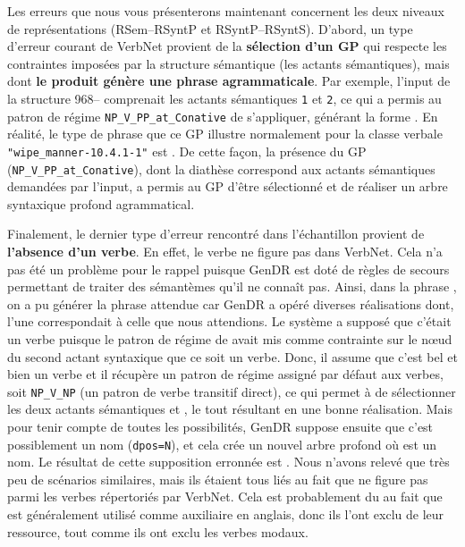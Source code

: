 Les erreurs que nous vous présenterons maintenant concernent les deux niveaux de représentations (\ac{RSem}--\ac{RSyntP} et \ac{RSyntP}--\ac{RSyntS}). D'abord, un type d'erreur courant de VerbNet provient de la \textbf{sélection d'un \ac{GP}} qui respecte les contraintes imposées par la structure sémantique (les actants sémantiques), mais dont \textbf{le produit génère une phrase agrammaticale}. Par exemple, l'input de la structure 968-- comprenait les actants sémantiques \texttt{1} et \texttt{2}, ce qui a permis au patron de régime \texttt{NP\_V\_PP\_at\_Conative} de s'appliquer, générant la forme \ungr{}. En réalité, le type de phrase que ce \ac{GP} illustre normalement pour la classe verbale \texttt{"wipe\_manner-10.4.1-1"} est . De cette façon, la présence du \ac{GP} (\texttt{NP\_V\_PP\_at\_Conative}), dont la diathèse correspond aux actants sémantiques demandées par l'input, a permis au \ac{GP} d'être sélectionné et de réaliser un arbre syntaxique profond agrammatical.

Finalement, le dernier type d'erreur rencontré dans l'échantillon provient de \textbf{l'absence d'un verbe}. En effet, le verbe  ne figure pas dans VerbNet. Cela n'a pas été un problème pour le rappel puisque GenDR est doté de règles de secours permettant de traiter des sémantèmes qu'il ne connaît pas. Ainsi, dans la phrase , on a pu générer la phrase attendue car GenDR a opéré diverses réalisations dont, l'une correspondait à celle que nous attendions. Le système a supposé que c'était un verbe puisque le patron de régime de  avait mis comme contrainte sur le n\oe{}ud du second actant syntaxique que ce soit un verbe. Donc, il assume que c'est bel et bien un verbe et il récupère un patron de régime assigné par défaut aux verbes, soit \texttt{NP\_V\_NP} (un patron de verbe transitif direct), ce qui permet à  de sélectionner les deux actants sémantiques  et , le tout résultant en une bonne réalisation. Mais pour tenir compte de toutes les possibilités, GenDR suppose ensuite que c'est possiblement un nom (\texttt{dpos=N}), et cela crée un nouvel arbre profond où  est un nom. Le résultat de cette supposition erronnée est \ungr{}. Nous n'avons relevé que très peu de scénarios similaires, mais ils étaient tous liés au fait que  ne figure pas parmi les verbes répertoriés par VerbNet. Cela est probablement du au fait que  est généralement utilisé comme auxiliaire en anglais, donc ils l'ont exclu de leur ressource, tout comme ils ont exclu les verbes modaux.

